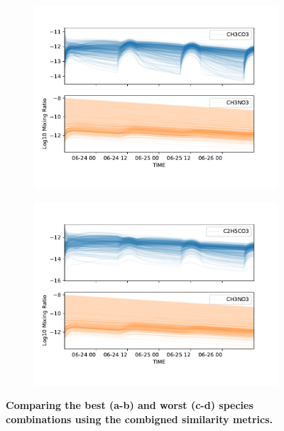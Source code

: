 \begin{figure}[H]
\begin{subfigure}[t]{.5\textwidth}
  \centering
  \includegraphics[width=\textwidth]{ensemble/CH3CO3-CH3NO3.pdf}
\end{subfigure}%
\begin{subfigure}[t]{.5\textwidth}
  \centering
  \includegraphics[width=\textwidth]{ensemble/C2H5CO3-CH3NO3.pdf}
\end{subfigure}%
\caption{\textbf{Comparing the best (a-b) and worst (c-d) species combinations using the combigned similarity metrics.} }
\label{fig:bestworst}
\end{figure}





